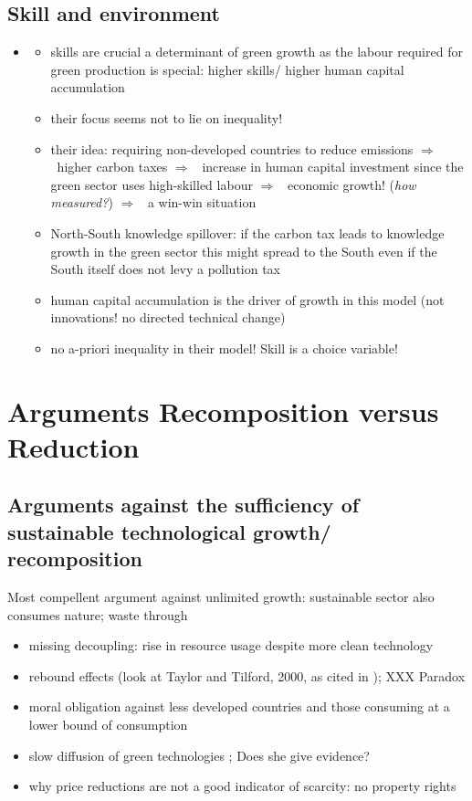 \documentclass[12pt]{article}
\newcommand{\ar}{$\Rightarrow$ \ }
\begin{document}
\subsection{Skill and environment}
\begin{itemize}
\item \cite{Borissov2019CarbonDevelopment}
\begin{itemize}
\item skills are crucial a determinant of green growth as the labour required for green production is special: higher skills/ higher human capital accumulation
\item their focus seems not to lie on inequality!
\item their idea: requiring non-developed countries to reduce emissions \ar higher carbon taxes \ar increase in human capital investment since the green sector uses high-skilled labour \ar economic growth! (\textit{how measured?}) \ar a win-win situation
\item North-South knowledge spillover: if the carbon tax leads to knowledge growth in the green sector this might spread to the South even if the South itself does not levy a pollution tax
\item human capital accumulation is the driver of growth in this model (not innovations! no directed technical change)
\item no a-priori inequality in their model! Skill is a choice variable! 
\end{itemize}
\end{itemize}

\section{Arguments Recomposition versus Reduction}
\subsection{Arguments against the sufficiency of sustainable technological growth/ recomposition}
Most compellent argument against unlimited growth: sustainable sector also consumes nature; waste through 
\begin{itemize}
\item missing decoupling: rise in resource usage despite more clean technology \citep{Alexander2012TheContext}
\item rebound effects (look at Taylor and Tilford, 2000, as cited in \cite{Schor2005SustainableReduction}); XXX Paradox \citep{Alexander2012TheContext}
\item moral obligation against less developed countries and those consuming at a lower bound of consumption \citep{Alexander2012TheContext}
\item slow diffusion of green technologies \citep{Schor2005SustainableReduction}; Does she give evidence?
\item why price reductions are not a good indicator of scarcity: no property rights \citep{Schor2005SustainableReduction}
\end{itemize}
\end{document}
